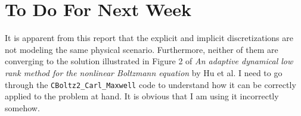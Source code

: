 \documentclass{article}
\begin{document}
\section{To Do For Next Week}
It is apparent from this report that the explicit and implicit discretizations are not modeling the same physical scenario. Furthermore, neither of them are converging to the solution illustrated in Figure 2 of \textit{An adaptive dynamical low rank method for the nonlinear Boltzmann equation} by Hu et al. I need to go through the \verb|CBoltz2_Carl_Maxwell| code to understand how it can be correctly applied to the problem at hand. It is obvious that I am using it incorrectly somehow.
\end{document}
